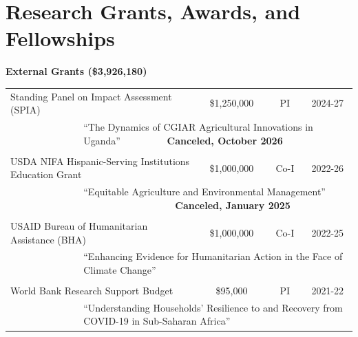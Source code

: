 \documentclass[letterpaper]{article}
\renewenvironment{itemize}{
  \begin{list}
  	{}{
    \setlength{\leftmargin}{1.5em}
    \setlength{\itemsep}{-.5em}
  }
}{
  \end{list}
}
\begin{document}
\section*{\sc Research Grants, Awards, and Fellowships}
\begin{itemize}
	
	\item {\bf External Grants (\$3,926,180)}
	
	\begin{tabular}{llccc}
		\multicolumn{2}{l}{Standing Panel on Impact Assessment (SPIA)}	& \$1,250,000 	& PI			& 2024-27 \\	
		& \multicolumn{4}{p{\linewidth}}{``The Dynamics of CGIAR Agricultural Innovations in Uganda'' \ \ \ \ \ \ \ \ \ \textbf{Canceled, October 2026}}  \\
		&&&& \\ 
		\multicolumn{2}{l}{USDA NIFA Hispanic-Serving Institutions Education Grant}	& \$1,000,000 	& Co-I			& 2022-26 \\	
		& \multicolumn{4}{p{\linewidth}}{``Equitable Agriculture and Environmental Management'' \ \ \ \ \ \ \ \ \ \ \ \ \ \ \ \ \ \ \ \textbf{Canceled, January 2025}} \\
		&&&& \\
		\multicolumn{2}{l}{USAID Bureau of Humanitarian Assistance (BHA)}	& \$1,000,000 	& Co-I			& 2022-25 \\	
		& \multicolumn{4}{p{\linewidth}}{``Enhancing Evidence for Humanitarian Action in the Face of Climate Change''} \\
		&&&& \\
		\multicolumn{2}{l}{World Bank Research Support Budget}	& \$95,000 	& PI			& 2021-22 \\	
		& \multicolumn{4}{p{\linewidth}}{``Understanding Households’ Resilience to and Recovery from COVID-19 in Sub-Saharan Africa''} \\
	\end{tabular}


\end{itemize}
\end{document}
